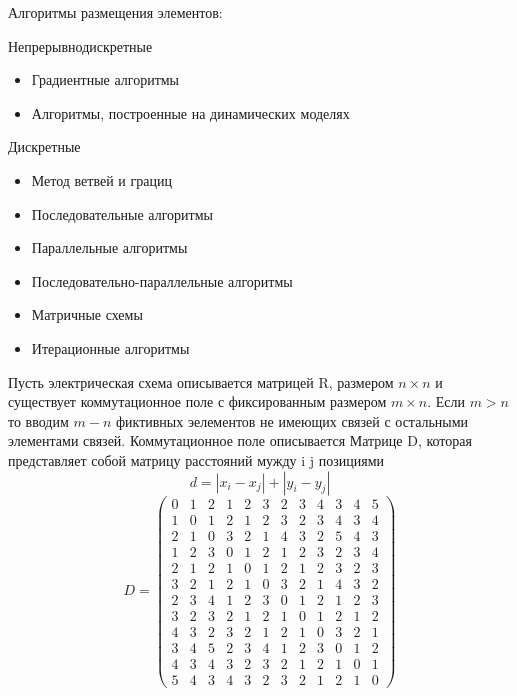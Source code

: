 \documentclass{article}
\begin{document}
	Алгоритмы размещения элементов:
	\begin{imtemize}
		\item Непрерывнодискретные
		\begin{itemize}
			\item Градиентные алгоритмы
			\item Алгоритмы, построенные на динамических моделях
		\end{itemize}
		\item Дискретные
		\begin{itemize}
			\item Метод ветвей и грациц
			\item Последовательные алгоритмы
			\item Параллельные алгоритмы
			\item Последовательно-параллельные алгоритмы
			\item Матричные схемы
			\item Итерационные алгоритмы
		\end{itemize}
	\end{imtemize}

	Пусть электрическая схема описывается матрицей R, размером $n \times n$ и существует коммутационное поле с фиксированным размером $m \times n$. Если $m > n$ то вводим $m - n$ фиктивных эелементов не имеющих связей с остальными элементами связей. Коммутационное поле описывается Матрице D, которая представляет собой матрицу расстояний мужду i j позициями
	$$
	d = |x_i - x_j| + |y_i - y_j|
	$$
	$$
	D = 
	\begin{pmatrix}
		0 & 1 & 2 & 1 & 2 & 3 & 2 & 3 & 4 & 3 & 4 & 5\\
		1 & 0 & 1 & 2 & 1 & 2 & 3 & 2 & 3 & 4 & 3 & 4\\
		2 & 1 & 0 & 3 & 2 & 1 & 4 & 3 & 2 & 5 & 4 & 3\\
		1 & 2 & 3 & 0 & 1 & 2 & 1 & 2 & 3 & 2 & 3 & 4\\
		2 & 1 & 2 & 1 & 0 & 1 & 2 & 1 & 2 & 3 & 2 & 3\\
		3 & 2 & 1 & 2 & 1 & 0 & 3 & 2 & 1 & 4 & 3 & 2\\
		2 & 3 & 4 & 1 & 2 & 3 & 0 & 1 & 2 & 1 & 2 & 3\\
		3 & 2 & 3 & 2 & 1 & 2 & 1 & 0 & 1 & 2 & 1 & 2\\
		4 & 3 & 2 & 3 & 2 & 1 & 2 & 1 & 0 & 3 & 2 & 1\\
		3 & 4 & 5 & 2 & 3 & 4 & 1 & 2 & 3 & 0 & 1 & 2\\
		4 & 3 & 4 & 3 & 2 & 3 & 2 & 1 & 2 & 1 & 0 & 1\\
		5 & 4 & 3 & 4 & 3 & 2 & 3 & 2 & 1 & 2 & 1 & 0
	\end{pmatrix}
	$$
\end{document}
